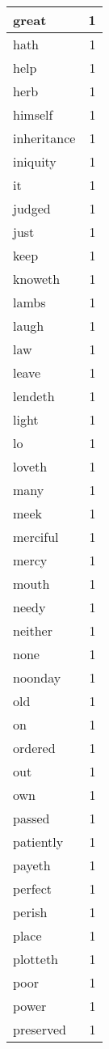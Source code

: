 \begin{center}
\begin{longtable}{l|r}
great & 1 \\ \hline
hath & 1 \\ \hline
help & 1 \\ \hline
herb & 1 \\ \hline
himself & 1 \\ \hline
inheritance & 1 \\ \hline
iniquity & 1 \\ \hline
it & 1 \\ \hline
judged & 1 \\ \hline
just & 1 \\ \hline
keep & 1 \\ \hline
knoweth & 1 \\ \hline
lambs & 1 \\ \hline
laugh & 1 \\ \hline
law & 1 \\ \hline
leave & 1 \\ \hline
lendeth & 1 \\ \hline
light & 1 \\ \hline
lo & 1 \\ \hline
loveth & 1 \\ \hline
many & 1 \\ \hline
meek & 1 \\ \hline
merciful & 1 \\ \hline
mercy & 1 \\ \hline
mouth & 1 \\ \hline
needy & 1 \\ \hline
neither & 1 \\ \hline
none & 1 \\ \hline
noonday & 1 \\ \hline
old & 1 \\ \hline
on & 1 \\ \hline
ordered & 1 \\ \hline
out & 1 \\ \hline
own & 1 \\ \hline
passed & 1 \\ \hline
patiently & 1 \\ \hline
payeth & 1 \\ \hline
perfect & 1 \\ \hline
perish & 1 \\ \hline
place & 1 \\ \hline
plotteth & 1 \\ \hline
poor & 1 \\ \hline
power & 1 \\ \hline
preserved & 1 \\ \hline

\end{longtable}
\end{center}

